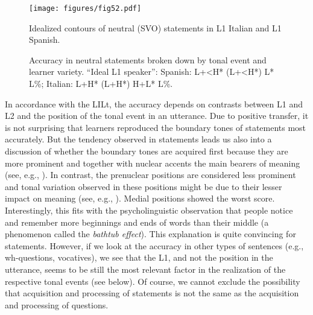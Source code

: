 \vfill
\begin{figure}[H]
\texttt{[image: figures/fig52.pdf]}
\caption{Idealized contours of neutral (SVO) statements in L1 Italian and L1 Spanish.}
\label{fig:5.2}
\end{figure}
\vfill\pagebreak

\begin{figure}





\caption{Accuracy in neutral statements broken down by tonal event and learner variety. ``Ideal L1 speaker'': Spanish: L+<H* (L+<H*) L* L\%; Italian: L+H* (L+H*) H+L* L\%.}
\label{fig:5.3}
\end{figure}

In accordance with the LILt, the accuracy depends on contrasts between L1 and L2 and the position of the tonal event in an utterance. Due to positive transfer, it is not surprising that learners reproduced the boundary tones of statements most accurately. But the tendency observed in statements leads us also into a discussion of whether the boundary tones are acquired first because they are more prominent and together with nuclear accents the main bearers of meaning (see, e.g., \citealt{Ladd2008}). In contrast, the prenuclear positions are considered less prominent and tonal variation observed in these positions might be due to their lesser impact on meaning (see, e.g., \citealt{GrabeEtAl2005}). Medial positions showed the worst score. Interestingly, this fits with the psycholinguistic observation that people notice and remember more beginnings and ends of words than their middle (a phenomenon called the \textit{bathtub effect}). This explanation is quite convincing for statements. However, if we look at the accuracy in other types of sentences (e.g., wh-questions, vocatives), we see that the L1, and not the position in the utterance, seems to be still the most relevant factor in the realization of the respective tonal events (see below). Of course, we cannot exclude the possibility that acquisition and processing of statements is not the same as the acquisition and processing of questions.


